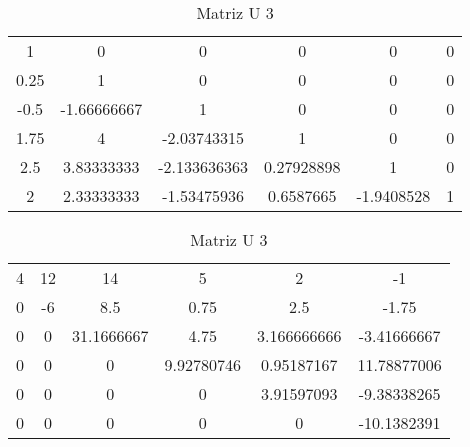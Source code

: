 \documentclass[12pt]{article}
\begin{document}

\begin{table}[htb]
  \begin{minipage}[b]{.46\linewidth}

    \centering
    \begin{tabular}{|c c c c c c|}
        1           &         0          &           0                        &   0             &   0      &   0\\
        0.25          &         1           &          0                      &   0             &   0      &   0\\
        -0.5           &         -1.66666667           &          1           &   0             &   0     &   0\\
        1.75           &         4           &           -2.03743315          &   1             &   0       &   0\\
        2.5           &         3.83333333           &           -2.133636363 &   0.27928898    &   1       &   0\\
        2           &         2.33333333           &           -1.53475936    &   0.6587665    &   -1.9408528       &   1\\
    \end{tabular}
    \caption{Matriz L 3}
    \label{tab:esq}

  \end{minipage}\hfill
  \begin{minipage}[b]{.46\linewidth}

    \centering
    \begin{tabular}{|c c c c c c|}
        4           &         12          &           14                        &   5             &   2      &   -1\\
        0          &         -6           &          8.5                      &   0.75             &   2.5      &   -1.75\\
        0           &       0           &          31.1666667           &   4.75             &   3.166666666     &   -3.41666667\\
        0           &         0           &           0          &   9.92780746             &   0.95187167       &   11.78877006\\
        0           &         0           &           0 &   0    &   3.91597093       &   -9.38338265\\
        0           &       0           &           0    &   0    &   0       &   -10.1382391\\
    \end{tabular}
    \caption{Matriz U 3}
    \label{tab:dir}
  \end{minipage}\hfill


\end{table}
\end{document}
